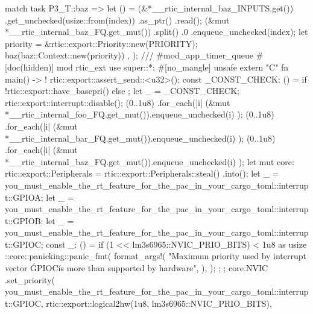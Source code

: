 {{{{                    match task {
                        P3_T::baz => {
                            let () = (&*__rtic_internal_baz_INPUTS.get())
                                .get_unchecked(usize::from(index))
                                .as_ptr()
                                .read();
                            (&mut *__rtic_internal_baz_FQ.get_mut())
                                .split()
                                .0
                                .enqueue_unchecked(index);
                            let priority = &rtic::export::Priority::new(PRIORITY);
                            baz(baz::Context::new(priority))
                        }
                    }
                }
            },
        );
    }
    /// #mod_app_timer_queue
    #[doc(hidden)]
    mod rtic_ext {
        use super::*;
        #[no_mangle]
        unsafe extern "C" fn main() -> ! {
            rtic::export::assert_send::<u32>();
            const _CONST_CHECK: () = { if !rtic::export::have_basepri() {} else {} };
            let _ = _CONST_CHECK;
            rtic::export::interrupt::disable();
            (0..1u8)
                .for_each(|i| {
                    (&mut *__rtic_internal_foo_FQ.get_mut()).enqueue_unchecked(i)
                });
            (0..1u8)
                .for_each(|i| {
                    (&mut *__rtic_internal_bar_FQ.get_mut()).enqueue_unchecked(i)
                });
            (0..1u8)
                .for_each(|i| {
                    (&mut *__rtic_internal_baz_FQ.get_mut()).enqueue_unchecked(i)
                });
            let mut core: rtic::export::Peripherals = rtic::export::Peripherals::steal()
                .into();
            let _ = you_must_enable_the_rt_feature_for_the_pac_in_your_cargo_toml::interrupt::GPIOA;
            let _ = you_must_enable_the_rt_feature_for_the_pac_in_your_cargo_toml::interrupt::GPIOB;
            let _ = you_must_enable_the_rt_feature_for_the_pac_in_your_cargo_toml::interrupt::GPIOC;
            const _: () = if (1 << lm3s6965::NVIC_PRIO_BITS) < 1u8 as usize {
                {
                    ::core::panicking::panic_fmt(
                        format_args!(
                            "Maximum priority used by interrupt vector \'GPIOC\' is more than supported by hardware",
                        ),
                    );
                };
            };
            core.NVIC
                .set_priority(
                    you_must_enable_the_rt_feature_for_the_pac_in_your_cargo_toml::interrupt::GPIOC,
                    rtic::export::logical2hw(1u8, lm3s6965::NVIC_PRIO_BITS),
}}}
